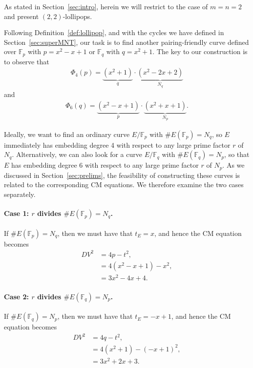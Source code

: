 \documentclass[version=preprint]{iacrcc}
\newcommand{\F}{\mathbb{F}}
\begin{document}
As stated in Section~\ref{sec:intro}, herein we will restrict to the case of $m=n=2$ and present $(2,2)$-lollipops. 



Following Definition~\ref{def:lollipop}, and with the cycles we have defined in Section~\ref{sec:superMNT}, our task is to find another pairing-friendly curve defined over $\F_p$ with $p=x^2-x+1$ or $\F_q$ with $q=x^2+1$. The key to our construction is to observe that
\begin{align}\label{eq:N_q}
\Phi_4(p) = \underbrace{(x^2+1)}_{q} \cdot \underbrace{(x^2-2x+2)}_{N_q}
\end{align}
and
\begin{align}\label{eq:N_p}
 \Phi_6(q) = \underbrace{(x^2-x+1)}_{p} \cdot \underbrace{(x^2+x+1)}_{N_p}. 
\end{align}


Ideally, we want to find an ordinary curve $E/\F_p$ with $\#E(\F_p)=N_q$, so $E$ immediately has embedding degree 4 with respect to any large prime factor $r$ of $N_q$. Alternatively, we can also look for a curve $E/\F_q$ with $\#E(\F_q)=N_p$, so that $E$ has embedding degree 6 with respect to any large prime factor $r$ of $N_p$. As we discussed in Section~\ref{sec:prelims}, the feasibility of constructing these curves is related to the corresponding CM equations. We therefore examine the two cases separately. 

\paragraph{Case 1: $r$ divides $\#E(\F_p)=N_q$.} If $\#E(\F_p) = N_q$, then we must have that $t_E = x$, and hence the CM equation becomes 
\begin{align}\label{CMp}
DV^2 &= 4p-t^2, \nonumber\\
	&=4(x^2-x+1) - x^2, \nonumber\\
	&=3x^2-4x+4. 
\end{align}

\paragraph{Case 2: $r$ divides $\#E(\F_q)=N_p$.} If $\#E(\F_q) = N_p$, then we must have that $t_E = -x+1$, and hence the CM equation becomes 
\begin{align}\label{CMq}
DV^2 &= 4q-t^2, \nonumber\\
	&=4(x^2+1) - (-x+1)^2, \nonumber\\
	&=3x^2+2x+3. 
\end{align}
\end{document}
